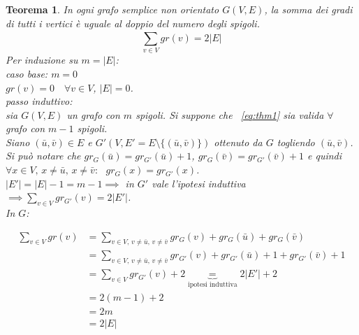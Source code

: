 \documentclass[a4paper, openany]{book}
\theoremstyle{plain}
\newtheorem{thm}{Teorema}[section]
\theoremstyle{definition}
\begin{document}
\begin{thm}
In ogni grafo semplice non orientato $G(V,E)$, la somma dei gradi di tutti i vertici è
uguale al doppio del numero degli spigoli.
\begin{equation} \label{eq:thm1} \sum_{v \in V}^{} gr(v) = 2|E| \end{equation}
\proof
	Per induzione su $m = |E|$:\\
	\emph{caso base: $m = 0$}\\	
	\indent $gr(v) = 0 \quad \forall v \in V$, \quad $|E| = 0$.\\
	\emph{passo induttivo:}\\
	\indent sia $G(V,E)$ un grafo con $m$ spigoli. Si suppone che ~\ref{eq:thm1} 
	sia valida $\forall$ grafo con $m-1$ spigoli.\\
	Siano $(\bar{u}, \bar{v}) \in E$ e $G'(V, E'=E \setminus \{(\bar{u}, \bar{v})\})$ ottenuto da $G$ togliendo 
	$(\bar{u}, \bar{v})$.\\
	Si può notare che $gr_G(\bar{u})= gr_{G'}(\bar{u})+1$, $gr_G(\bar{v}) = gr_{G'}(\bar{v})+1$ e quindi
	${\forall x \in V \text{, } x \neq \bar{u} \text{, }  x \neq \bar{v}: \text{ } gr_G(x) = gr_{G'}(x)}$.\\%
	$|E'| = |E|-1 = m -1 \implies$ in $G'$ vale l'ipotesi induttiva 
    ${\implies \sum_{v \in V}^{} gr_{G'}(v) = 2|E'|}$.\\In $G$:

    \begin{equation*}
    \begin{split}
	 \sum_{v \in V}^{} gr(v) & = 
     \sum_{v \in V \text{, } v \neq \bar{u} \text{, } v \neq \bar{v} }^{} 
        gr_G(v)+gr_G(\bar{u})+gr_G(\bar{v}) \\ & =
	 \sum_{v\in V\text{, }v\neq \bar{u}\text{, } v\neq \bar{v} }^{} 
        gr_{G'}(v)+gr_{G'}(\bar{u})+1 +gr_{G'}(\bar{v}) +1 \\ & =
	 \sum_{v \in V}^{} gr_{G'}(v) + 2 \underbrace{=}_{\text{ipotesi induttiva}} 2|E'| + 2 \\
     & = 2(m-1) + 2 \\
	 & = 2m \\ & = 2|E|
    \end{split}
    \end{equation*}
        
\endproof
\end{thm}
\end{document}
